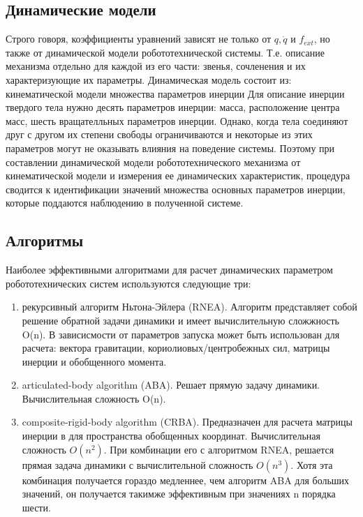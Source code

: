 \documentclass[a4paper,14pt]{extreport}
\begin{document}
\subsection{Динамические модели}

Строго говоря, коэффициенты уравнений зависят не только от $q, \dot q$ и $f_{ext}$, но также от динамической модели робототехнической системы.
Т.е. описание механизма отдельно для каждой из его части: звенья, сочленения и их характеризующие их параметры. Динамическая модель состоит из:
кинематической модели
множества параметров инерции
Для описание инерции твердого тела нужно десять параметров инерции: масса, расположение центра масс, шесть вращателльных параметров инерции. Однако, когда тела соединяют друг с другом их степени свободы ограничиваются и некоторые из этих параметров могут не оказывать влияния на поведение системы. Поэтому при составлении динамической модели робототехнического механизма от кинематической модели и измерения ее динамических характеристик, процедура сводится к идентификации значений множества основных параметров инерции, которые поддаются наблюдению в полученной системе.


\subsection{Алгоритмы}

Наиболее эффективными алгоритмами для расчет динамических параметром робототехнических систем используются следующие три:

\begin{enumerate}
	\item рекурсивный алгоритм Ньтона-Эйлера (RNEA). Алгоритм представляет собой решение обратной задачи динамики и имеет вычислительную сложжность O(n). В зависисмости от параметров запуска может быть использован для расчета: вектора гравитации, кориолиовых/центробежных сил, матрицы инерции и обобщенного момента.
	\item articulated-body algorithm (ABA). Решает прямую задачу динамики. Вычислительная сложность O(n).
	\item composite-rigid-body algorithm (CRBA). Предназначен для расчета матрицы инерции в для пространства обобщенных координат. Вычислительная сложность $O(n^2)$. При комбинации его с алгоритмом RNEA, решается прямая задача динамики с вычислительной сложность $O(n^3)$. Хотя эта комбинация получается гораздо медленнее, чем алгоритм ABA для больших значений, он получается такимже эффективным при значениях n порядка шести.
	
\end{enumerate}
\end{document}
